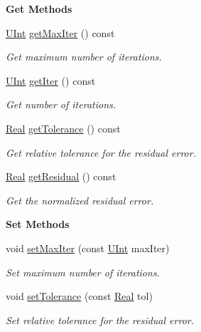\begin{Indent}{\bf Get Methods}\par
\begin{DoxyCompactItemize}
\item 
\hyperlink{namespaceFVCode3D_a4bf7e328c75d0fd504050d040ebe9eda}{U\+Int} \hyperlink{classFVCode3D_1_1IterativeSolver_aec62f7a81cb3368ac0d7c046d3520126}{get\+Max\+Iter} () const 
\begin{DoxyCompactList}\small\item\em Get maximum number of iterations. \end{DoxyCompactList}\item 
\hyperlink{namespaceFVCode3D_a4bf7e328c75d0fd504050d040ebe9eda}{U\+Int} \hyperlink{classFVCode3D_1_1IterativeSolver_a324a1f3c87599f62970e5aa5667cc2fd}{get\+Iter} () const 
\begin{DoxyCompactList}\small\item\em Get number of iterations. \end{DoxyCompactList}\item 
\hyperlink{namespaceFVCode3D_a40c1f5588a248569d80aa5f867080e83}{Real} \hyperlink{classFVCode3D_1_1IterativeSolver_ad642bc9330e6eb2c07585fb1defdff7f}{get\+Tolerance} () const 
\begin{DoxyCompactList}\small\item\em Get relative tolerance for the residual error. \end{DoxyCompactList}\item 
\hyperlink{namespaceFVCode3D_a40c1f5588a248569d80aa5f867080e83}{Real} \hyperlink{classFVCode3D_1_1IterativeSolver_ad12b116e1607a5a00b9c78e49326a99d}{get\+Residual} () const 
\begin{DoxyCompactList}\small\item\em Get the normalized residual error. \end{DoxyCompactList}\end{DoxyCompactItemize}
\end{Indent}
\begin{Indent}{\bf Set Methods}\par
\begin{DoxyCompactItemize}
\item 
void \hyperlink{classFVCode3D_1_1IterativeSolver_ad6416fe3ac3b79c4a1141d94a8797f54}{set\+Max\+Iter} (const \hyperlink{namespaceFVCode3D_a4bf7e328c75d0fd504050d040ebe9eda}{U\+Int} max\+Iter)
\begin{DoxyCompactList}\small\item\em Set maximum number of iterations. \end{DoxyCompactList}\item 
void \hyperlink{classFVCode3D_1_1IterativeSolver_ae3ce4a200ffcc97fcc2bb4b9a2b5784b}{set\+Tolerance} (const \hyperlink{namespaceFVCode3D_a40c1f5588a248569d80aa5f867080e83}{Real} tol)
\begin{DoxyCompactList}\small\item\em Set relative tolerance for the residual error. \end{DoxyCompactList}\end{DoxyCompactItemize}
\end{Indent}
